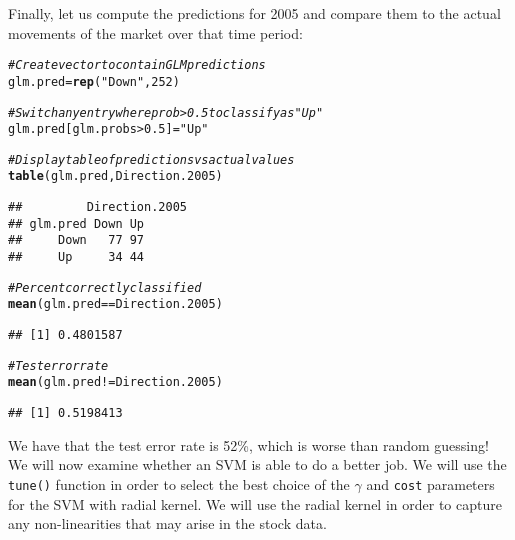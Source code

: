 \documentclass[12pt]{article}\usepackage[]{graphicx}\usepackage[]{color}
\makeatletter
\newcommand{\hlnum}[1]{\textcolor[rgb]{0.686,0.059,0.569}{#1}}%
\newcommand{\hlstr}[1]{\textcolor[rgb]{0.192,0.494,0.8}{#1}}%
\newcommand{\hlcom}[1]{\textcolor[rgb]{0.678,0.584,0.686}{\textit{#1}}}%
\newcommand{\hlopt}[1]{\textcolor[rgb]{0,0,0}{#1}}%
\newcommand{\hlstd}[1]{\textcolor[rgb]{0.345,0.345,0.345}{#1}}%
\newcommand{\hlkwb}[1]{\textcolor[rgb]{0.69,0.353,0.396}{#1}}%
\newcommand{\hlkwd}[1]{\textcolor[rgb]{0.737,0.353,0.396}{\textbf{#1}}}%
\newenvironment{kframe}{%
 \def\at@end@of@kframe{}%
 \ifinner\ifhmode%
  \def\at@end@of@kframe{\end{minipage}}%
  \begin{minipage}{\columnwidth}%
 \fi\fi%
 \def\FrameCommand##1{\hskip\@totalleftmargin \hskip-\fboxsep
 \colorbox{shadecolor}{##1}\hskip-\fboxsep
     \hskip-\linewidth \hskip-\@totalleftmargin \hskip\columnwidth}%
 \MakeFramed {\advance\hsize-\width
   \@totalleftmargin\z@ \linewidth\hsize
   \@setminipage}}%
 {\par\unskip\endMakeFramed%
 \at@end@of@kframe}
\newenvironment{knitrout}{}{} %
\makeatother
\begin{document}
Finally, let us compute the predictions for 2005 and compare them to the actual movements of the market over that time period:

\begin{knitrout}
\color{fgcolor}\begin{kframe}
\begin{alltt}
\hlcom{#Create vector to contain GLM predictions}
\hlstd{glm.pred} \hlkwb{=} \hlkwd{rep}\hlstd{(}\hlstr{"Down"}\hlstd{,} \hlnum{252}\hlstd{)}

\hlcom{#Switch any entry where prob > 0.5 to classify as "Up"}
\hlstd{glm.pred[glm.probs}\hlopt{>}\hlnum{0.5}\hlstd{]} \hlkwb{=} \hlstr{"Up"}

\hlcom{#Display table of predictions vs actual values}
\hlkwd{table}\hlstd{(glm.pred, Direction.2005)}
\end{alltt}
\begin{verbatim}
##         Direction.2005
## glm.pred Down Up
##     Down   77 97
##     Up     34 44
\end{verbatim}
\begin{alltt}
\hlcom{#Percent correctly classified}
\hlkwd{mean}\hlstd{(glm.pred} \hlopt{==} \hlstd{Direction.2005)}
\end{alltt}
\begin{verbatim}
## [1] 0.4801587
\end{verbatim}
\begin{alltt}
\hlcom{#Test error rate}
\hlkwd{mean}\hlstd{(glm.pred} \hlopt{!=} \hlstd{Direction.2005)}
\end{alltt}
\begin{verbatim}
## [1] 0.5198413
\end{verbatim}
\end{kframe}
\end{knitrout}

We have that the test error rate is 52\%, which is worse than random guessing! We will now examine whether an SVM is able to do a better job. We will use the \texttt{tune()} function in order to select the best choice of the $\gamma$ and \texttt{cost} parameters for the SVM with radial kernel. We will use the radial kernel in order to capture any non-linearities that may arise in the stock data.
\end{document}
